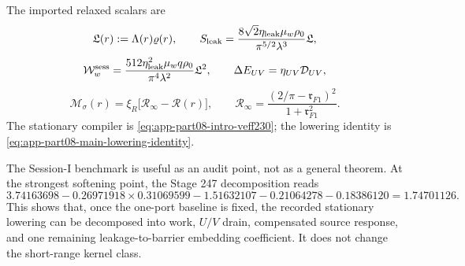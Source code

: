 The imported relaxed scalars are
\begin{equation}
\label{eq:app-part08-stage247-lag-l}
\mathfrak L(r):=\Lambda(r)\varrho(r),
\qquad
S_{\rm leak}=\frac{8\sqrt2\eta_{\rm leak}\mu_w\rho_0}{\pi^{5/2}\lambda^3}\mathfrak L,
\end{equation}
\begin{equation}
\label{eq:app-part08-stage247-work}
\mathcal W_w^{\rm sess}
=
\frac{512\eta_{\rm leak}^{2}\mu_wq\rho_0}{\pi^4\lambda^2}\mathfrak L^2,
\qquad
\Delta E_{UV}=\eta_{UV}\mathcal D_{UV},
\end{equation}
\begin{equation}
\label{eq:app-part08-stage247-source-lowering}
\mathcal M_\sigma(r)=\xi_R\bigl[\mathcal R_\infty-\mathcal R(r)\bigr],
\qquad
\mathcal R_\infty=\frac{(2/\pi-\mathfrak r_{F1})^2}{1+\mathfrak r_{F1}^2}.
\end{equation}
The stationary compiler is \cref{eq:app-part08-intro-veff230}; the lowering identity is \cref{eq:app-part08-main-lowering-identity}.

The Session-I benchmark is useful as an audit point, not as a general theorem.  At the strongest softening point, the Stage 247 decomposition reads
\begin{equation}
\label{eq:app-part08-stage247-benchmark-decomposition}
3.74163698
-
0.26971918\times0.31069599
-
1.51632107
-
0.21064278
-
0.18386120
=
1.74701126.
\end{equation}
This shows that, once the one-port baseline is fixed, the recorded stationary lowering can be decomposed into work, \(U/V\) drain, compensated source response, and one remaining leakage-to-barrier embedding coefficient.  It does not change the short-range kernel class.
